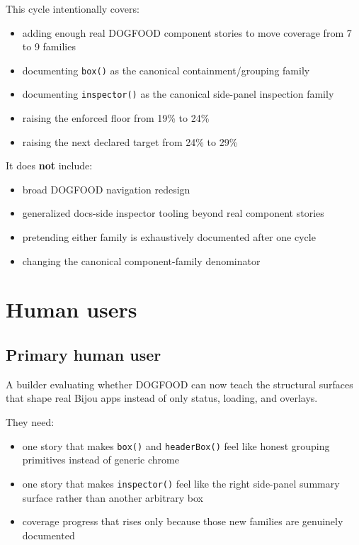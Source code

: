 This cycle intentionally covers:

\begin{itemize}
\tightlist
\item
  adding enough real DOGFOOD component stories to move coverage from 7 to 9 families
\item
  documenting \texttt{b\allowbreak{}o\allowbreak{}x\allowbreak{}(\allowbreak{})} as the canonical containment/grouping family
\item
  documenting \texttt{i\allowbreak{}n\allowbreak{}s\allowbreak{}p\allowbreak{}e\allowbreak{}c\allowbreak{}t\allowbreak{}o\allowbreak{}r\allowbreak{}(\allowbreak{})} as the canonical side-panel inspection family
\item
  raising the enforced floor from 19\% to 24\%
\item
  raising the next declared target from 24\% to 29\%
\end{itemize}

It does \textbf{not} include:

\begin{itemize}
\tightlist
\item
  broad DOGFOOD navigation redesign
\item
  generalized docs-side inspector tooling beyond real component stories
\item
  pretending either family is exhaustively documented after one cycle
\item
  changing the canonical component-family denominator
\end{itemize}

\section{Human users}\label{record-068-human-users}

\subsection{Primary human user}\label{record-068-primary-human-user}

A builder evaluating whether DOGFOOD can now teach the structural surfaces that shape real Bijou apps instead of only status, loading, and overlays.

They need:

\begin{itemize}
\tightlist
\item
  one story that makes \texttt{b\allowbreak{}o\allowbreak{}x\allowbreak{}(\allowbreak{})} and \texttt{h\allowbreak{}e\allowbreak{}a\allowbreak{}d\allowbreak{}e\allowbreak{}r\allowbreak{}B\allowbreak{}o\allowbreak{}x\allowbreak{}(\allowbreak{})} feel like honest grouping primitives instead of generic chrome
\item
  one story that makes \texttt{i\allowbreak{}n\allowbreak{}s\allowbreak{}p\allowbreak{}e\allowbreak{}c\allowbreak{}t\allowbreak{}o\allowbreak{}r\allowbreak{}(\allowbreak{})} feel like the right side-panel summary surface rather than another arbitrary box
\item
  coverage progress that rises only because those new families are genuinely documented
\end{itemize}

